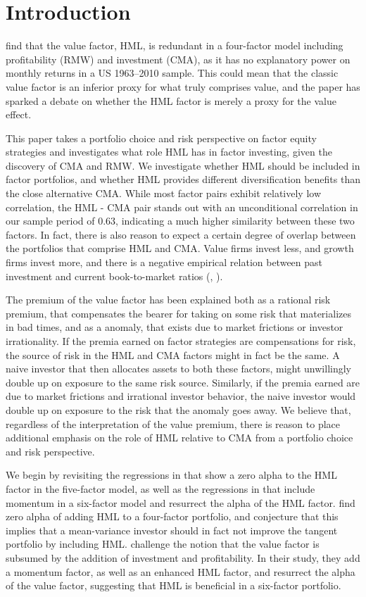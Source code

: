\section{Introduction}
\textcite{FF2015} find that the value factor, HML, is redundant in a four-factor model including profitability (RMW) and investment (CMA), as it has no explanatory power on monthly returns in a US 1963–2010 sample. This could mean that the classic value factor is an inferior proxy for what truly comprises value, and the paper has sparked a debate on whether the HML factor is merely a proxy for the value effect.

This paper takes a portfolio choice and risk perspective on factor equity strategies and investigates what role HML has in factor investing, given the discovery of CMA and RMW. We investigate whether HML should be included in factor portfolios, and whether HML provides different diversification benefits than the close alternative CMA. While most factor pairs exhibit relatively low correlation, the HML - CMA pair stands out with an unconditional correlation in our sample period of 0.63, indicating a much higher similarity between these two factors. In fact, there is also reason to expect a certain degree of overlap between the portfolios that comprise HML and CMA. Value firms invest less, and growth firms invest more, and there is a negative empirical relation between past investment and current book-to-market ratios (\textcite{Zhang2005}, \textcite{AndersonGarciaFeijoo2006}). 

The premium of the value factor has been explained both as a rational risk premium, that compensates the bearer for taking on some risk that materializes in bad times, and as a anomaly, that exists due to market frictions or investor irrationality. If the premia earned on factor strategies are compensations for risk, the source of risk in the HML and CMA factors might in fact be the same. A naive investor that then allocates assets to both these factors, might unwillingly double up on exposure to the same risk source. Similarly, if the premia earned are due to market frictions and irrational investor behavior, the naive investor would double up on exposure to the risk that the anomaly goes away. We believe that, regardless of the interpretation of the value premium, there is reason to place additional emphasis on the role of HML relative to CMA from a portfolio choice and risk perspective.

We begin by revisiting the regressions in \textcite{FF2015} that show a zero alpha to the HML factor in the five-factor model, as well as the regressions in \textcite{Asness2015} that include momentum in a six-factor model and resurrect the alpha of the HML factor. \textcite{FF2015} find zero alpha of adding HML to a four-factor portfolio, and conjecture that this implies that a mean-variance investor should in fact not improve the tangent portfolio by including HML. \textcite{Asness2015} challenge the notion that the value factor is subsumed by the addition of investment and profitability. In their study, they add a momentum factor, as well as an enhanced HML factor, and resurrect the alpha of the value factor, suggesting that HML is beneficial in a six-factor portfolio.

